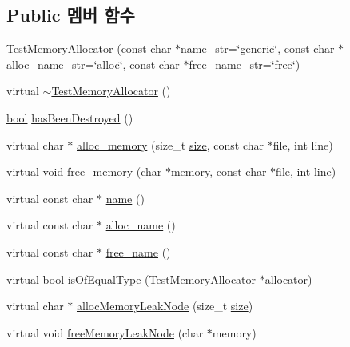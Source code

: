 \subsection*{Public 멤버 함수}
\begin{DoxyCompactItemize}
\item 
\hyperlink{class_test_memory_allocator_a3c55aa6d4598f5f14a69522dc8639552}{Test\+Memory\+Allocator} (const char $\ast$name\+\_\+str=\char`\"{}generic\char`\"{}, const char $\ast$alloc\+\_\+name\+\_\+str=\char`\"{}alloc\char`\"{}, const char $\ast$free\+\_\+name\+\_\+str=\char`\"{}free\char`\"{})
\item 
virtual \hyperlink{class_test_memory_allocator_a41f48221106531a27bcd578aeaec0abb}{$\sim$\+Test\+Memory\+Allocator} ()
\item 
\hyperlink{avb__gptp_8h_af6a258d8f3ee5206d682d799316314b1}{bool} \hyperlink{class_test_memory_allocator_ae26c82159ce24eb59770352585b402fd}{has\+Been\+Destroyed} ()
\item 
virtual char $\ast$ \hyperlink{class_test_memory_allocator_a2ebbde51a1d514c74e9e2a09a21b0624}{alloc\+\_\+memory} (size\+\_\+t \hyperlink{gst__avb__playbin_8c_a439227feff9d7f55384e8780cfc2eb82}{size}, const char $\ast$file, int line)
\item 
virtual void \hyperlink{class_test_memory_allocator_a529ac9813d3b0836ce0b964449942534}{free\+\_\+memory} (char $\ast$memory, const char $\ast$file, int line)
\item 
virtual const char $\ast$ \hyperlink{class_test_memory_allocator_a6a96605bec5749750a0b4be6e2d6e721}{name} ()
\item 
virtual const char $\ast$ \hyperlink{class_test_memory_allocator_afab6c44b5468c71a699c1efbd787e6e7}{alloc\+\_\+name} ()
\item 
virtual const char $\ast$ \hyperlink{class_test_memory_allocator_aac134aac79b30bc5903d0b2b7cc55b74}{free\+\_\+name} ()
\item 
virtual \hyperlink{avb__gptp_8h_af6a258d8f3ee5206d682d799316314b1}{bool} \hyperlink{class_test_memory_allocator_a3d6a5cc2f6b7a38b3f1d3e0567bf4f93}{is\+Of\+Equal\+Type} (\hyperlink{class_test_memory_allocator}{Test\+Memory\+Allocator} $\ast$\hyperlink{_memory_leak_warning_test_8cpp_a83fc2e9b9142613f7df2bcc3ff8292bc}{allocator})
\item 
virtual char $\ast$ \hyperlink{class_test_memory_allocator_a1a786ad58b46528e82235a14fa667c1d}{alloc\+Memory\+Leak\+Node} (size\+\_\+t \hyperlink{gst__avb__playbin_8c_a439227feff9d7f55384e8780cfc2eb82}{size})
\item 
virtual void \hyperlink{class_test_memory_allocator_a10f2958f3b7378256e933896ccc93df0}{free\+Memory\+Leak\+Node} (char $\ast$memory)
\end{DoxyCompactItemize}
